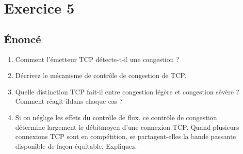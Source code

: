 \documentclass[a4paper, 11pt, titlepage]{article}
\begin{document}
\section{Exercice 5}
\subsection{\'Enoncé}
\begin{enumerate}[label=(\alph*)]
  \item Comment l’émetteur TCP détecte-t-il une congestion ?
  \item Décrivez le mécanisme de contrôle de congestion de TCP.
  \item Quelle distinction TCP fait-il entre congestion légère et congestion sévère ? Comment réagit-ildans chaque cas ? 
  \item Si on néglige les effets du contrôle de flux, ce contrôle de congestion détermine largement le débitmoyen d’une connexion TCP. Quand plusieurs connexions TCP sont en compétition, se partagent-elles la bande passante disponible de façon équitable. Expliquez.
\end{enumerate}
\end{document}
